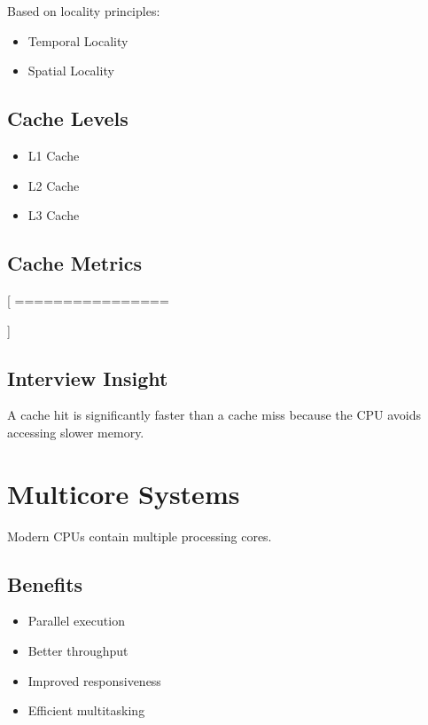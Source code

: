Based on locality principles:

\begin{itemize}
\item Temporal Locality
\item Spatial Locality
\end{itemize}

\subsection{Cache Levels}

\begin{itemize}
\item L1 Cache
\item L2 Cache
\item L3 Cache
\end{itemize}

\subsection{Cache Metrics}

[
================

{}
]

\subsection{Interview Insight}

A cache hit is significantly faster than a cache miss because the CPU avoids accessing slower memory.

\section{Multicore Systems}

Modern CPUs contain multiple processing cores.

\subsection{Benefits}

\begin{itemize}
\item Parallel execution
\item Better throughput
\item Improved responsiveness
\item Efficient multitasking
\end{itemize}

